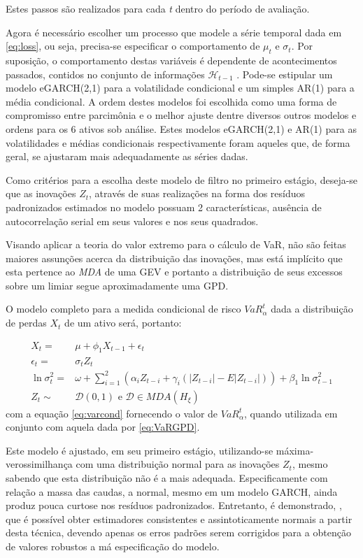 \documentclass[1p]{elsarticle}
\theoremstyle{definition}
\begin{document}
Estes passos são realizados para cada \emph{t} dentro do período de avaliação.

Agora é necessário escolher um processo que modele a série temporal dada em \eqref{eq:loss}, ou seja, precisa-se especificar o comportamento de $\mu_t$ e $\sigma_t$. Por suposição, o comportamento destas variáveis é dependente de acontecimentos passados, contidos no conjunto de informações $\mathcal{H}_{t-1}$ . Pode-se estipular um modelo eGARCH(2,1) para a volatilidade condicional e um simples AR(1) para a média condicional. A ordem destes modelos foi escolhida como uma forma de compromisso entre parcimônia e o melhor ajuste dentre diversos outros modelos e ordens para os 6 ativos sob análise. Estes modelos eGARCH(2,1) e AR(1) para as volatilidades e médias condicionais respectivamente foram aqueles que, de forma geral, se ajustaram mais adequadamente as séries dadas.

Como critérios para a escolha deste modelo de filtro no primeiro estágio, deseja-se que as inovações $Z_t$, através de suas realizações na forma dos resíduos padronizados estimados no modelo possuam 2 características, ausência de autocorrelação serial em seus valores e nos seus quadrados.

Visando aplicar a teoria do valor extremo para o cálculo de VaR, não são feitas maiores assunções acerca da distribuição das inovações, mas está implícito que esta pertence ao \emph{MDA} de uma GEV e portanto a distribuição de seus excessos sobre um limiar segue aproximadamente uma GPD.

O modelo completo para a medida condicional de risco $VaR_\alpha^t$ dada a distribuição de perdas $X_t$ de um ativo será, portanto:

\begin{align}
X_t=&\mu+ \phi_1 X_{t-1}+\epsilon_t \\
\epsilon_t=&\sigma_t Z_t\\
\ln\sigma_t^2=&\omega+ \sum_{i=1}^{2}\left(\alpha_i Z_{t-i}+ \gamma_i(|Z_{t-i}|-E|Z_{t-i}|)\right)+ \beta_1 \ln\sigma_{t-1}^2 \label{eq:sigma2} \\
Z_t\sim &\mathcal{D}(0,1) \text{ e } \mathcal{D} \in MDA(H_\xi)
\end{align}
com a equação \eqref{eq:varcond} fornecendo o valor de $VaR_\alpha^t$, quando utilizada em conjunto com aquela dada por \eqref{eq:VaRGPD}.

Este modelo é ajustado, em seu primeiro estágio, utilizando-se máxima-verossimilhança com uma distribuição normal para as inovações $Z_t$, mesmo sabendo que esta distribuição não é a mais adequada. Especificamente com relação a massa das caudas, a normal, mesmo em um modelo GARCH, ainda produz pouca curtose nos resíduos padronizados. Entretanto, é demonstrado, \cite[Capítulo 4]{Gourieroux1997}, que é possível obter estimadores consistentes e assintoticamente normais a partir desta técnica, devendo apenas os erros padrões serem corrigidos para a obtenção de valores robustos a má especificação do modelo.
\end{document}
